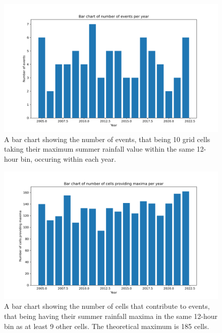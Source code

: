 \documentclass[12pt,a4paper,oneside]{report}
\begin{document}
\begin{figure}[H]
    \centering
    \includegraphics[width=150mm]{eventsyear}
    \caption[A bar chart showing the number of events occurring in each year.]{A bar chart showing the number of events,
        that being 10 grid cells taking their maximum summer rainfall value within the same 12-hour bin,
    occuring within each year.}
    \label{fig:eventsyear}
\end{figure}
\begin{figure}[H]
    \centering
    \includegraphics[width=150mm]{cellsyear}
    \caption[A bar chart showing the number of cells that contribute to events.]{
        A bar chart showing the number of cells that contribute to events,
        that being having their summer rainfall maxima in the same 12-hour bin as at least 9 other cells.
        The theoretical maximum is 185 cells.}
    \label{fig:cellsyear}
\end{figure}




\end{document}
